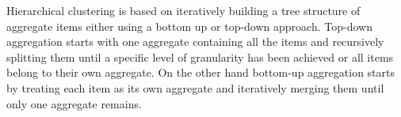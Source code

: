 Hierarchical clustering is based on iteratively building a tree structure of aggregate items
either using a bottom up or top-down approach. Top-down aggregation starts with one aggregate containing
all the items and recursively splitting them until a specific level of granularity has been achieved or
all items belong to their own aggregate.
On the other hand bottom-up aggregation starts by treating each item as its own aggregate and iteratively
merging them until only one aggregate remains.

